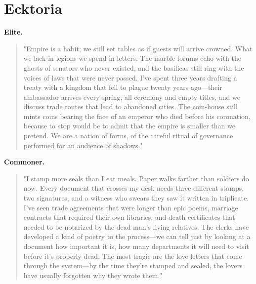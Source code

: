 \section*{Ecktoria}
\textbf{Elite.}
\begin{quote}
"Empire is a habit; we still set tables as if guests will arrive crowned. What we lack in legions we spend in letters. The marble forums echo with the ghosts of senators who never existed, and the basilicas still ring with the voices of laws that were never passed. I've spent three years drafting a treaty with a kingdom that fell to plague twenty years ago—their ambassador arrives every spring, all ceremony and empty titles, and we discuss trade routes that lead to abandoned cities. The coin-house still mints coins bearing the face of an emperor who died before his coronation, because to stop would be to admit that the empire is smaller than we pretend. We are a nation of forms, of the careful ritual of governance performed for an audience of shadows."
\end{quote}
\textbf{Commoner.}
\begin{quote}
"I stamp more seals than I eat meals. Paper walks farther than soldiers do now. Every document that crosses my desk needs three different stamps, two signatures, and a witness who swears they saw it written in triplicate. I've seen trade agreements that were longer than epic poems, marriage contracts that required their own libraries, and death certificates that needed to be notarized by the dead man's living relatives. The clerks have developed a kind of poetry to the process—we can tell just by looking at a document how important it is, how many departments it will need to visit before it's properly dead. The most tragic are the love letters that come through the system—by the time they're stamped and sealed, the lovers have usually forgotten why they wrote them."
\end{quote}

